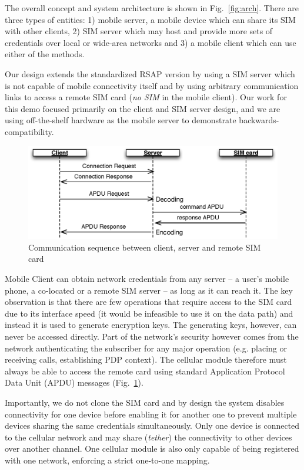 \documentclass{sig-alternate-10pt}
\begin{document}
The overall concept and system architecture is shown in Fig.~\ref{fig:arch}. There are three types of entities: 1) mobile server, a mobile device which can share its SIM with other clients, 2) SIM server which may host and provide more sets of credentials over local or wide-area networks and 3) a mobile client which can use either of the methods.

Our design extends the standardized RSAP version by using a SIM server which is not capable of mobile connectivity itself and by using arbitrary communication links to access a remote SIM card (\emph{no SIM} in the mobile client). Our work for this demo focused primarily on the client and SIM server design, and we are using off-the-shelf hardware as the mobile server to demonstrate backwards-compatibility.

\begin{figure}[t!]
\centering
\includegraphics[width=0.9\columnwidth]{figs/sequence}
\vspace{-2mm}
\caption{Communication sequence between client, server and remote SIM card}
\label{fig:sequence}
\vspace{-4mm}
\end{figure}

Mobile Client can obtain network credentials from any server -- a user's mobile phone, a co-located or a remote SIM server -- as long as it can reach it. The key observation is that there are few operations that require access to the SIM card due to its interface speed (it would be infeasible to use it on the data path) and instead it is used to generate encryption keys. The generating keys, however, can never be accessed directly. Part of the network's security however comes from the network authenticating the subscriber for any major operation (e.g. placing or receiving calls, establishing PDP context). The cellular module therefore must always be able to access the remote card using standard Application Protocol Data Unit (APDU) messages (Fig.~\ref{fig:sequence}).

Importantly, we do not clone the SIM card and by design the system disables connectivity for one device before enabling it for another one to prevent multiple devices sharing the same credentials simultaneously. Only one device is connected to the cellular network and may share (\emph{tether}) the connectivity to other devices over another channel. One cellular module is also only capable of being registered with one network, enforcing a strict one-to-one mapping.
\end{document}
